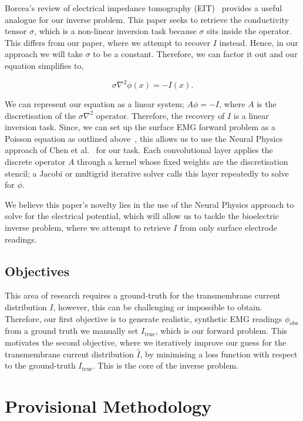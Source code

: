 \documentclass[project-plan]{report-template}
\begin{document}
Borcea's review of electrical impedance tomography (EIT)~\cite{borcea2002} provides a useful analogue for our inverse problem. This paper seeks to retrieve the conductivity tensor $\sigma$, which is a non-linear inversion task because $\sigma$ sits inside the operator. This differs from our paper, where we attempt to recover $I$ instead. Hence, in our approach we will take $\sigma$ to be a constant. Therefore, we can factor it out and our equation simplifies to,

$$
\sigma \nabla^2 \phi(x) = -I(x).
$$

We can represent our equation as a linear system; $A \phi = -I$, where $A$ is the discretisation of the $\sigma \nabla^2$ operator. Therefore, the recovery of $I$ is a linear inversion task. Since, we can set up the surface EMG forward problem as a Poisson equation as outlined above~\cite{mesin2013}, this allows us to use the Neural Physics approach of Chen et al.~\cite{chen2026} for our task. Each convolutional layer applies the discrete operator $A$ through a kernel whose fixed weights are the discretisation stencil; a Jacobi or multigrid iterative solver calls this layer repeatedly to solve for $\phi$.

We believe this paper's novelty lies in the use of the Neural Physics approach to solve for the electrical potential, which will allow us to tackle the bioelectric inverse problem, where we attempt to retrieve $I$ from only surface electrode readings.

\subsection{Objectives}
This area of research requires a ground-truth for the transmembrane current distribution $I$, however, this can be challenging or impossible to obtain. Therefore, our first objective is to generate realistic, synthetic EMG readings $\phi_{\text{obs}}$ from a ground truth we manually set $I_{\text{true}}$, which is our forward problem. This motivates the second objective, where we iteratively improve our guess for the transmembrane current distribution $\hat{I}$, by minimising a loss function with respect to the ground-truth $I_{\text{true}}$. This is the core of the inverse problem.

\section{Provisional Methodology}
\end{document}
